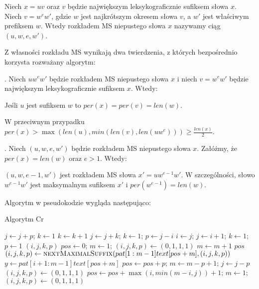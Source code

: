 \begin{definition}[Rozkład MS]
Niech $x=uv$ oraz $v$ będzie największym leksykograficznie sufiksem słowa $x$. Niech $v=w^{e}w'$, gdzie $w$ jest najkrótszym okresem słowa $v$, a $w'$ jest właściwym prefiksem $w$. Wtedy rozkładem MS niepustego słowa $x$ nazywamy ciąg $(u, w, e, w')$.
\end{definition}

Z własności rozkładu MS wynikają dwa twierdzenia, z których bezpośrednio korzysta rozważany algorytm: 

\begingroup
\leftskip \parindent

.
Niech $uw^{e}w'$ będzie rozkładem MS niepustego słowa $x$ i niech $v=w^{e}w'$ będzie największym leksykograficznie sufiksem $x$. Wtedy:

\noindent
Jeśli $u$ jest sufiksem $w$ to $per(x)=per(v)=len(w)$.

\noindent
W przeciwnym przypadku $per(x)>\max(len(u), min(len(v), len(uw^{e}))) \geq \frac{len(x)}{2}$.

.
Niech $(u,w,e,w')$ będzie rozkładem MS niepustego słowa $x$. Załóżmy, że $per(x) = len(w)$ oraz $e > 1$. Wtedy:

\noindent
$(u,w,e-1,w')$ jest rozkładem MS słowa $x'=uw^{e-1}w'$. W szczególności, słowo $w^{e-1}w'$ jest maksymalnym sufiksem $x'$ i $per(w^{e-1})=len(w)$.

\endgroup

\noindent
Algorytm w pseudokodzie wygląda następująco:
\begin{algorithm}
\caption{Algorytm Cr}\label{alg:co}
\begin{algorithmic}[1]
                \State $j \gets j+p$; $k \gets 1$
            \Else
                \State $k \gets k+1$
            \EndIf
            \State $j \gets j+k$; $k \gets 1$; $p \gets j-i$
        \Else
            \State $i \gets j$; $j \gets i+1$; $k \gets 1$; $p \gets 1$
        \EndIf
  \EndWhile
  \State \Return $(i,j,k,p)$
\EndFunction
\State $pos \gets 0$; $m \gets 1$; $(i,j,k,p) \gets (0,1,1,1)$
        \State $m \gets m+1$
    \EndWhile
        \State \Return $pos$
    \EndIf
    \State $(i,j,k,p) \gets \textsc{nextMaximalSuffix}(pat[1:m-1]text[pos+m], (i,j,k,p))$
    \State $y \gets pat[i+1:m-1]text[pos+m]$
        \State $pos \gets pos + p$; $m \gets m-p+1$;
            \State $j \gets j-p$
        \Else
            \State $(i,j,k,p) \gets (0,1,1,1)$
        \EndIf
    \Else
        \State $pos \gets pos + \max(i, min(m-i,j)) + 1$; $m \gets 1$; $(i,j,k,p) \gets (0,1,1,1)$
    \EndIf
\EndWhile
\end{algorithmic}
\end{algorithm}

